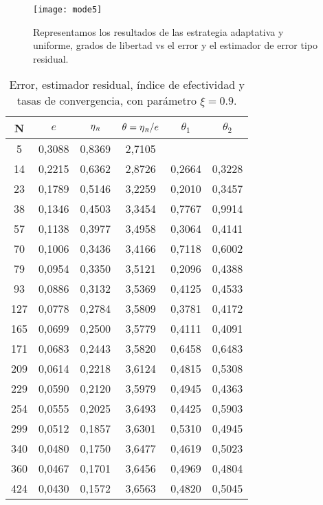 \begin{figure}[h!]
	\centering
	\texttt{[image: mode5]}
	\caption{Representamos los resultados de las estrategia adaptativa y uniforme, grados de libertad vs el error y el estimador de error tipo residual.}
	\label{fig:mode5}
\end{figure}
\newpage
\begin{table}[h!]\label{table5}
	\centering
	\begin{tabular}{c | c| c| c| c|c } \hline
		N  &  $e$	& $\eta_{\text{\tiny $R$}}$  &	$\theta=\eta_{\text{\tiny $R$}}/e$	& $\theta_{1}$	&  $\theta_{2}$ \\ \hline 
		5  &	0,3088&	0,8369&	2,7105&		  &   \\
		14 &	0,2215&	0,6362&	2,8726&	0,2664&	0,3228\\
		23 &	0,1789&	0,5146&	3,2259&	0,2010&	0,3457\\
		38 &	0,1346&	0,4503&	3,3454&	0,7767&	0,9914\\
		57 &	0,1138&	0,3977&	3,4958&	0,3064&	0,4141\\
		70 &	0,1006&	0,3436&	3,4166&	0,7118&	0,6002\\
		79 &	0,0954&	0,3350&	3,5121&	0,2096&	0,4388\\
		93 &	0,0886&	0,3132&	3,5369&	0,4125&	0,4533\\
		127&	0,0778&	0,2784&	3,5809&	0,3781&	0,4172\\
		165&	0,0699&	0,2500&	3,5779&	0,4111&	0,4091\\
		171&	0,0683&	0,2443&	3,5820&	0,6458&	0,6483\\
		209&	0,0614&	0,2218&	3,6124&	0,4815&	0,5308\\
		229&	0,0590&	0,2120&	3,5979&	0,4945&	0,4363\\
		254&	0,0555&	0,2025&	3,6493&	0,4425&	0,5903\\
		299&	0,0512&	0,1857&	3,6301&	0,5310&	0,4945\\
		340&	0,0480&	0,1750&	3,6477&	0,4619&	0,5023\\
		360&	0,0467&	0,1701&	3,6456&	0,4969&	0,4804\\
		424&	0,0430&	0,1572&	3,6563&	0,4820&	0,5045\\\hline
	\end{tabular} \\
	\caption{Error, estimador residual, \'indice de efectividad y tasas de convergencia, con par\'ametro $\xi=0.9$. }
\end{table}


